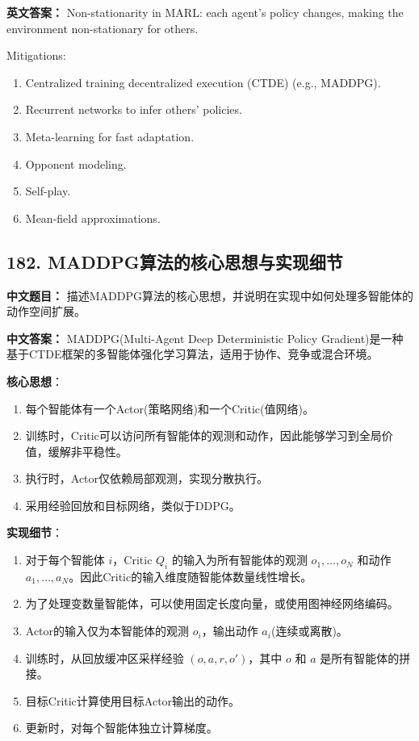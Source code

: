 \documentclass[10pt,a4paper]{ctexart}
\begin{document}
\textbf{英文答案：}  
Non-stationarity in MARL: each agent's policy changes, making the environment non-stationary for others.

Mitigations:
\begin{enumerate}
    \item Centralized training decentralized execution (CTDE) (e.g., MADDPG).
    \item Recurrent networks to infer others' policies.
    \item Meta-learning for fast adaptation.
    \item Opponent modeling.
    \item Self-play.
    \item Mean-field approximations.
\end{enumerate}

\subsection*{182. MADDPG算法的核心思想与实现细节}
\textbf{中文题目：} 描述MADDPG算法的核心思想，并说明在实现中如何处理多智能体的动作空间扩展。

\textbf{中文答案：}  
MADDPG(Multi-Agent Deep Deterministic Policy Gradient)是一种基于CTDE框架的多智能体强化学习算法，适用于协作、竞争或混合环境。

\textbf{核心思想}：
\begin{enumerate}
    \item 每个智能体有一个Actor(策略网络)和一个Critic(值网络)。
    \item 训练时，Critic可以访问所有智能体的观测和动作，因此能够学习到全局价值，缓解非平稳性。
    \item 执行时，Actor仅依赖局部观测，实现分散执行。
    \item 采用经验回放和目标网络，类似于DDPG。
\end{enumerate}

\textbf{实现细节}：
\begin{enumerate}
    \item 对于每个智能体 $i$，Critic $Q_i$ 的输入为所有智能体的观测 $o_1, \dots, o_N$ 和动作 $a_1, \dots, a_N$。因此Critic的输入维度随智能体数量线性增长。
    \item 为了处理变数量智能体，可以使用固定长度向量，或使用图神经网络编码。
    \item Actor的输入仅为本智能体的观测 $o_i$，输出动作 $a_i$(连续或离散)。
    \item 训练时，从回放缓冲区采样经验 $(o, a, r, o')$，其中 $o$ 和 $a$ 是所有智能体的拼接。
    \item 目标Critic计算使用目标Actor输出的动作。
    \item 更新时，对每个智能体独立计算梯度。
\end{enumerate}
\end{document}

